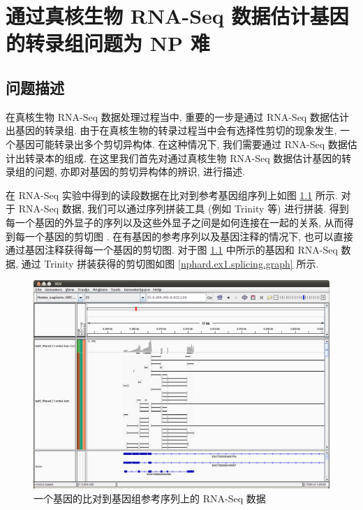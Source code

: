 \chapter{通过真核生物 RNA-Seq 数据估计基因的转录组问题为 NP 难}
\label{chap-rna-seq-nphard}

\section{问题描述}
在真核生物 RNA-Seq 数据处理过程当中, 重要的一步是通过 RNA-Seq 数据估计出基因的转录组. 
由于在真核生物的转录过程当中会有选择性剪切的现象发生, 一个基因可能转录出多个剪切异构体. 
在这种情况下, 我们需要通过 RNA-Seq 数据估计出转录本的组成. 
在这里我们首先对通过真核生物 RNA-Seq 数据估计基因的转录组的问题, 
亦即对基因的剪切异构体的辨识, 进行描述. 

在 RNA-Seq 实验中得到的读段数据在比对到参考基因组序列上如图 \ref{nphard.ex1.aligned.data} 所示. 
对于 RNA-Seq 数据, 
我们可以通过序列拼装工具 (例如 Trinity \cite{grabherr2011full} 等) 进行拼装. 
得到每一个基因的外显子的序列以及这些外显子之间是如何连接在一起的关系, 
从而得到每一个基因的剪切图 \cite{Heber01072002}. 
在有基因的参考序列以及基因注释的情况下, 也可以直接通过基因注释获得每一个基因的剪切图. 
对于图 \ref{nphard.ex1.aligned.data} 中所示的基因和 RNA-Seq 数据, 
通过 Trinity 拼装获得的剪切图如图 \ref{nphard.ex1.splicing.graph} 所示. 

\begin{figure}[!t]
\centering
\includegraphics[width=\textwidth]{figures/nphard/comp1.png}
\caption{一个基因的比对到基因组参考序列上的 RNA-Seq 数据}
\label{nphard.ex1.aligned.data}
\end{figure}

